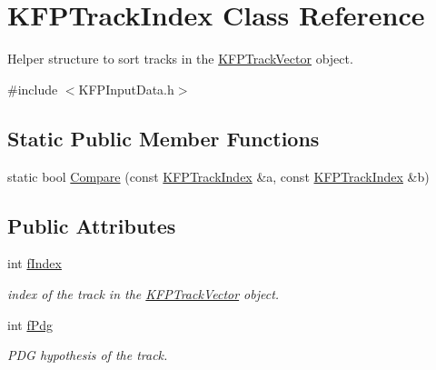 \hypertarget{structKFPTrackIndex}{}\section{K\+F\+P\+Track\+Index Class Reference}
\label{structKFPTrackIndex}


Helper structure to sort tracks in the \hyperlink{classKFPTrackVector}{K\+F\+P\+Track\+Vector} object.  




{\ttfamily \#include $<$K\+F\+P\+Input\+Data.\+h$>$}

\subsection*{Static Public Member Functions}
\begin{DoxyCompactItemize}
\item 
static bool \hyperlink{structKFPTrackIndex_a27f641de5d6c9b447d79d32400896eb0}{Compare} (const \hyperlink{structKFPTrackIndex}{K\+F\+P\+Track\+Index} \&a, const \hyperlink{structKFPTrackIndex}{K\+F\+P\+Track\+Index} \&b)
\end{DoxyCompactItemize}
\subsection*{Public Attributes}
\begin{DoxyCompactItemize}
\item 
int \hyperlink{structKFPTrackIndex_a3a3b345e3b879e7c9f243fd64022c0e5}{f\+Index}\hypertarget{structKFPTrackIndex_a3a3b345e3b879e7c9f243fd64022c0e5}{}\label{structKFPTrackIndex_a3a3b345e3b879e7c9f243fd64022c0e5}

\begin{DoxyCompactList}\small\item\em index of the track in the \hyperlink{classKFPTrackVector}{K\+F\+P\+Track\+Vector} object. \end{DoxyCompactList}\item 
int \hyperlink{structKFPTrackIndex_a8dd317da45950cafb4733d5fbacddb8f}{f\+Pdg}\hypertarget{structKFPTrackIndex_a8dd317da45950cafb4733d5fbacddb8f}{}\label{structKFPTrackIndex_a8dd317da45950cafb4733d5fbacddb8f}

\begin{DoxyCompactList}\small\item\em P\+DG hypothesis of the track. \end{DoxyCompactList}\end{DoxyCompactItemize}


